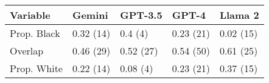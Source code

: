 
\begin{tabular}{lllll}
\toprule
Variable & Gemini & GPT-3.5 & GPT-4 & Llama 2\\
\midrule
Prop. Black & 0.32 (14) & 0.4 (4) & 0.23 (21) & 0.02 (15)\\
Overlap & 0.46 (29) & 0.52 (27) & 0.54 (50) & 0.61 (25)\\
Prop. White & 0.22 (14) & 0.08 (4) & 0.23 (21) & 0.37 (15)\\
\bottomrule
\end{tabular}
